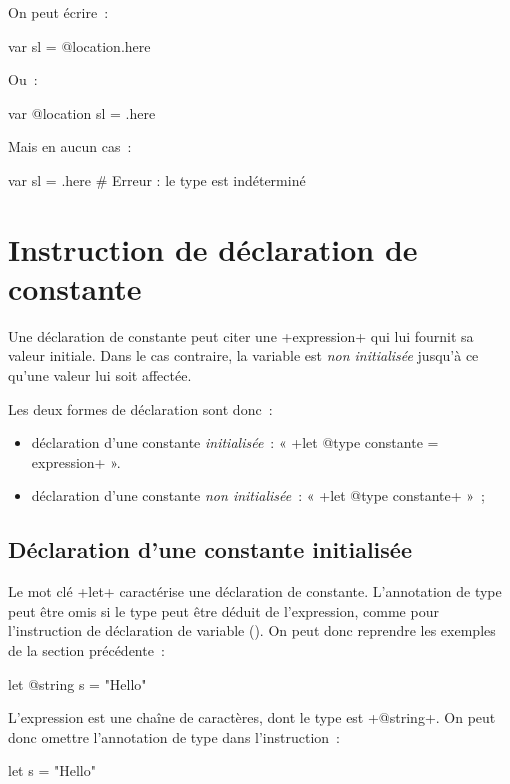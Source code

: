 On peut écrire~:
\begin{galgas4}
var sl = @location.here
\end{galgas4}

Ou~:
\begin{galgas4}
var @location sl = .here
\end{galgas4}

Mais en aucun cas~:
\begin{galgas4}
var sl = .here # Erreur : le type est indéterminé
\end{galgas4}





\section{Instruction de déclaration de constante}

Une déclaration de constante peut citer une \ggsq+expression+ qui lui fournit sa valeur initiale. Dans le cas contraire, la variable est \emph{non initialisée} jusqu'à ce qu'une valeur lui soit affectée.

Les deux formes de déclaration sont donc~:
\begin{itemize}
\item déclaration d'une constante \emph{initialisée}~: « \ggsq+let @type constante = expression+ ».
\item déclaration d'une constante \emph{non initialisée}~: « \ggsq+let @type constante+ »~;
\end{itemize}

\subsection{Déclaration d'une constante initialisée}


Le mot clé \ggsq+let+ caractérise une déclaration de constante. L'annotation de type peut être omis si le type peut être déduit de l'expression, comme pour l'instruction de déclaration de variable (). On peut donc reprendre les exemples de la section précédente~:
\begin{galgas4}
let @string s = "Hello"
\end{galgas4}

L'expression est une chaîne de caractères, dont le type est \ggsq+@string+. On peut donc omettre l'annotation de type dans l'instruction~:
\begin{galgas4}
let s = "Hello"
\end{galgas4}


